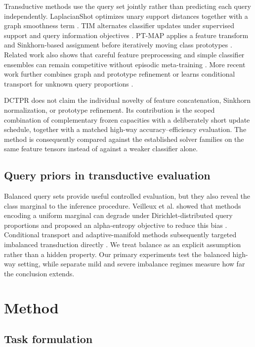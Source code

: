 \documentclass[10pt,twocolumn]{article}
\newcommand{\method}{\textsc{DCTPR}\xspace}
\begin{document}
Transductive methods use the query set jointly rather than predicting each query
independently. LaplacianShot optimizes unary support distances together with a
graph smoothness term \cite{laplacianshot}. TIM alternates classifier updates
under supervised support and query information objectives \cite{tim}. PT-MAP
applies a feature transform and Sinkhorn-based assignment before iteratively
moving class prototypes \cite{ptmap}. Related work also shows that careful
feature preprocessing and simple classifier ensembles can remain competitive
without episodic meta-training \cite{squeezefeatures,easy}. More recent work further combines graph
and prototype refinement \cite{iterativegraph} or learns conditional transport
for unknown query proportions \cite{conditionaltransport}.

\method does not claim the individual novelty of feature concatenation,
Sinkhorn normalization, or prototype refinement. Its contribution is the scoped
combination of complementary frozen capacities with a deliberately short update
schedule, together with a matched high-way accuracy--efficiency evaluation. The
method is consequently compared against the established solver families on the
same feature tensors instead of against a weaker classifier alone.

\subsection{Query priors in transductive evaluation}

Balanced query sets provide useful controlled evaluation, but they also reveal
the class marginal to the inference procedure. Veilleux et al. showed that
methods encoding a uniform marginal can degrade under Dirichlet-distributed
query proportions and proposed an alpha-entropy objective to reduce this bias
\cite{realistictransduction}. Conditional transport and adaptive-manifold
methods subsequently targeted imbalanced transduction directly
\cite{conditionaltransport,adaptivemanifold}. We treat balance as an explicit
assumption rather than a hidden property. Our primary experiments test the
balanced high-way setting, while separate mild and severe imbalance regimes
measure how far the conclusion extends.

\section{Method}
\label{sec:method}

\subsection{Task formulation}
\end{document}
